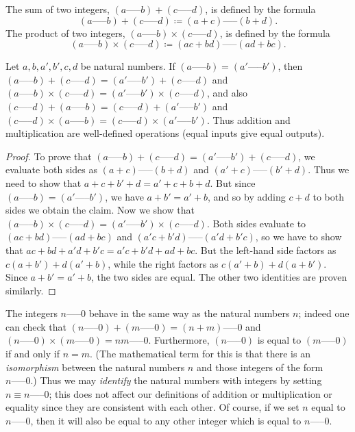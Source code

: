 \begin{definition}\label{4.1.2}
The sum of two integers, \((a \text{-----} b) + (c \text{-----} d)\), is defined by the formula
\[
    (a \text{-----} b) + (c \text{-----} d) \coloneqq (a + c) \text{-----} (b + d).
\]
The product of two integers, \((a \text{-----} b) \times (c \text{-----} d)\), is defined by the formula
\[
    (a \text{-----} b) \times (c \text{-----} d) \coloneqq (ac + bd) \text{-----} (ad + bc).
\]
\end{definition}

\begin{lemma}\label{4.1.3}
Let \(a, b, a', b', c, d\) be natural numbers.
If \((a \text{-----} b) = (a' \text{-----} b')\), then \((a \text{-----} b) + (c \text{-----} d) = (a' \text{-----} b') + (c \text{-----} d)\) and \((a \text{-----} b) \times (c \text{-----} d) = (a' \text{-----} b') \times (c \text{-----} d)\), and also \((c \text{-----} d) + (a \text{-----} b) = (c \text{-----} d) + (a' \text{-----} b')\) and \((c \text{-----} d) \times (a \text{-----} b) = (c \text{-----} d) \times (a' \text{-----} b')\).
Thus addition and multiplication are well-defined operations (equal inputs give equal outputs).
\end{lemma}

\begin{proof}
To prove that \((a \text{-----} b) + (c \text{-----} d) = (a' \text{-----} b') + (c \text{-----} d)\), we evaluate both sides as \((a + c) \text{-----} (b + d)\) and \((a' + c) \text{-----} (b' + d)\).
Thus we need to show that \(a + c + b' + d = a' + c + b + d\).
But since \((a \text{-----} b) = (a' \text{-----} b')\), we have \(a + b' = a' + b\), and so by adding \(c + d\) to both sides we obtain the claim.
Now we show that \((a \text{-----} b) \times (c \text{-----} d) = (a' \text{-----} b') \times (c \text{-----} d)\).
Both sides evaluate to \((ac + bd) \text{-----} (ad + bc)\) and \((a'c + b'd) \text{-----} (a'd + b'c)\), so we have to show that \(ac + bd + a'd + b'c = a'c + b'd + ad + bc\).
But the left-hand side factors as \(c(a + b') + d(a' + b)\), while the right factors as \(c(a' + b) + d(a + b')\).
Since \(a + b' = a' + b\), the two sides are equal.
The other two identities are proven similarly.
\end{proof}

The integers \(n \text{-----} 0\) behave in the same way as the natural numbers \(n\);
indeed one can check that \((n \text{-----} 0) + (m \text{-----} 0) = (n + m) \text{-----} 0\) and \((n \text{-----} 0) \times (m \text{-----} 0) = nm \text{-----} 0\).
Furthermore, \((n \text{-----} 0)\) is equal to \((m \text{-----} 0)\) if and only if \(n = m\).
(The mathematical term for this is that there is an \emph{isomorphism} between the natural numbers \(n\) and those integers of the form \(n \text{-----} 0\).)
Thus we may \emph{identify} the natural numbers with integers by setting \(n \equiv n \text{-----} 0\);
this does not affect our definitions of addition or multiplication or equality since they are consistent with each other.
Of course, if we set \(n\) equal to \(n \text{-----} 0\), then it will also be equal to any other integer which is equal to \(n \text{-----} 0\).

